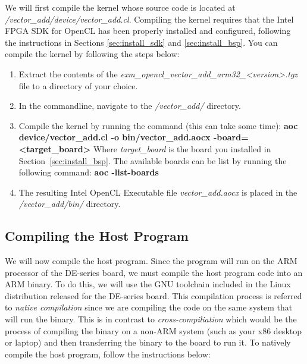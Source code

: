 \documentclass[11pt, twoside, pdftex]{article}
\begin{document}
We will first compile the kernel whose source code is located at \textit{/vector\_add/device/vector\_add.cl}. Compiling the kernel requires that the Intel FPGA SDK for OpenCL has been properly installed and configured, following the instructions in Sections \ref{sec:install_sdk} and \ref{sec:install_bsp}. You can compile the kernel by following the steps below:

\begin{enumerate}
\item Extract the contents of the \textit{exm\_opencl\_vector\_add\_arm32\_<version>.tgz} file to a directory of your choice.
\item In the commandline, navigate to the \textit{/vector\_add/} directory.
\item Compile the kernel by running the command (this can take some time):
\textbf{aoc device/vector\_add.cl -o bin/vector\_add.aocx -board=<target\_board>}
Where \textit{target\_board} is the board you installed in Section~\ref{sec:install_bsp}. The available boards can be list by running the following command:
	\textbf{aoc -list-boards}
\item The resulting Intel OpenCL Executable file \textit{vector\_add.aocx} is placed in the \textit{/vector\_add/bin/} directory.
\end{enumerate}

\subsection{Compiling the Host Program}

We will now compile the host program. Since the program will run on the ARM processor of the DE-series board, we must compile the host program code into an ARM binary. To do this, we will use the GNU toolchain included in the Linux distribution released for the DE-series board. This compilation process is referred to \textit{native compilation} since we are compiling the code on the same system that will run the binary. This is in contrast to \textit{cross-compiliation} which would be the process of compiling the binary on a non-ARM system (such as your x86 desktop or laptop) and then transferring the binary to the board to run it. To natively compile the host program, follow the instructions below:
\end{document}
